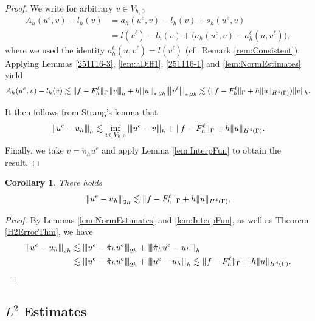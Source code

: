 \documentclass[10pt, a4paper]{amsart}
\newtheorem{corollary}[theorem]{Corollary}
\theoremstyle{definition}
\theoremstyle{remark}
\theoremstyle{example}
\numberwithin{equation}{section}
\newcommand{\tbar}[1]{{\left\vert\kern-0.25ex\left\vert\kern-0.25ex\left\vert #1 
    \right\vert\kern-0.25ex\right\vert\kern-0.25ex\right\vert}}
\begin{document}
\begin{proof}
We write for arbitrary $v\in V_{h,0}$ 
\begin{align*}
A_h(u^e,v) - l_h(v) 
&= a_h(u^e,v)-l_h(v) +s_h(u^e,v)\\
& = l(v^\ell) - l_h(v) +\big(a_h(u^e,v)-a_h^\ell(u,v^\ell)\big),
\end{align*}
where we used the identity $a_h^\ell(u,v^\ell) = l(v^\ell)$ (cf.~Remark \ref{rem:Consistent}).
Applying Lemmas \ref{251116-3}, \ref{lem:aDiff1}, \ref{251116-1} and \ref{lem:NormEstimates} yield
\begin{align*}
A_h(u^e,v) - l_h(v) 
\lesssim \|f-F_h^\ell\|_\Gamma \tbar{v}_h + h \tbar{u}_{*,2h} \tbar{v^\ell}_{*,2h}
\lesssim (\|f-F_h^\ell\|_\Gamma + h \|u\|_{H^4(\Gamma)}) \|v\|_h.
\end{align*}


It then follows from Strang's lemma  that
\begin{align*}
\tbar{u^e - u_h}_h\lesssim  \inf_{v\in V_{h,0}} \tbar{u^e-v}_{h} + \|f-F_h^\ell\|_{\Gamma} + h\|u\|_{H^4(\Gamma)}.
\end{align*}
Finally, we take $v = \mathring{\pi}_h u^e$ and apply Lemma \ref{lem:InterpFun} to obtain the result.
\end{proof}

\begin{corollary}\label{cor:2h}
There holds
\[
\tbar{u^e - u_h}_{2h}\lesssim \|f-F_h^\ell\|_\Gamma + h\|u\|_{H^4(\Gamma)}.
\]
\end{corollary}
\begin{proof}
By Lemmas \ref{lem:NormEstimates} and \ref{lem:InterpFun}, 
as well as Theorem \ref{H2ErrorThm}, we have
\begin{align*}
\tbar{u^e - u_h}_{2h}&\lesssim \tbar{u^e-\mathring{\pi}_h u^e}_{2h}+\tbar{\mathring{\pi}_h u^e-u_h}_h\\
&\lesssim 
\tbar{u^e-\mathring{\pi}_h u^e}_{2h}+\tbar{u^e - u_h}_h\lesssim \|f-F_h^\ell\|_\Gamma + h\|u\|_{H^4(\Gamma)}.
\end{align*}
\end{proof}


\subsection{$L^2$ Estimates}
\end{document}
